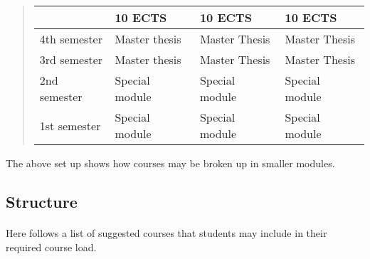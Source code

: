 \documentclass[%
oneside,                 %
final,                   %
10pt]{article}
\begin{document}
\begin{quote}
\begin{tabular}{llll}
\hline
\multicolumn{1}{l}{  } & \multicolumn{1}{l}{ 10 ECTS } & \multicolumn{1}{l}{ 10 ECTS } & \multicolumn{1}{l}{ 10 ECTS } \\
\hline
4th semester & Master thesis  & Master Thesis  & Master Thesis  \\
\hline
3rd semester & Master thesis  & Master Thesis  & Master Thesis  \\
\hline
2nd semester & Special module & Special module & Special module \\
\hline
1st semester & Special module & Special module & Special module \\
\hline
\end{tabular}
\end{quote}

\noindent
The above set up shows how courses may be broken up in smaller modules.






\subsection*{Structure}

\paragraph{}
Here follows a list of suggested courses that students may include in their required course load.
\end{document}
